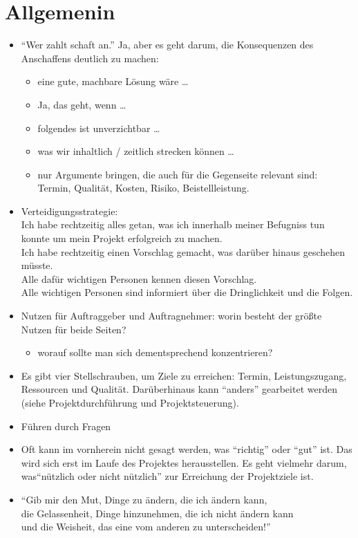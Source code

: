 \documentclass[a4paper]{article}
\begin{document}
\usepackage{scrartcl}

\section{Allgemenin}
\begin{itemize}
  \item ``Wer zahlt schaft an.'' Ja, aber es geht  darum, die Konsequenzen des Anschaffens deutlich zu machen:
    \begin{itemize}
      \item eine gute, machbare Lösung wäre \ldots
      \item Ja, das geht, wenn \ldots
      \item folgendes ist unverzichtbar \ldots
      \item was wir inhaltlich / zeitlich strecken können \ldots
      \item nur Argumente bringen, die auch für die Gegenseite relevant sind:\\
	Termin, Qualität, Kosten, Risiko, Beistellleistung.
    \end{itemize}
  \item Verteidigungsstrategie:\\
    Ich habe rechtzeitig alles getan, was ich innerhalb meiner Befugniss tun konnte um mein Projekt erfolgreich zu machen.\\
    Ich habe rechtzeitig einen Vorschlag gemacht, was darüber hinaus geschehen müsste.\\
    Alle dafür wichtigen Personen kennen diesen Vorschlag.\\
    Alle wichtigen Personen sind informiert über die Dringlichkeit und die Folgen.
  \item Nutzen für Auftraggeber und Auftragnehmer: worin besteht der größte Nutzen für beide Seiten?
    \begin{itemize}
      \item worauf sollte man sich dementsprechend konzentrieren?
    \end{itemize}
  \item Es gibt vier Stellschrauben, um Ziele zu erreichen: Termin, Leistungszugang, Ressourcen und Qualität. Darüberhinaus kann ``anders'' gearbeitet werden (siehe Projektdurchführung und Projektsteuerung).
  \item Führen durch Fragen
  \item Oft kann im vornherein nicht gesagt werden, was ``richtig'' oder ``gut'' ist. Das wird sich erst im Laufe des Projektes herausstellen. Es geht vielmehr darum, was``nützlich oder nicht nützlich'' zur Erreichung der Projektziele ist.
  \item ``Gib mir den Mut, Dinge zu ändern, die ich ändern kann,\\
    die Gelassenheit, Dinge hinzunehmen, die ich nicht ändern kann\\
    und die Weisheit, das eine vom anderen zu unterscheiden!''
\end{itemize}
\end{document}
